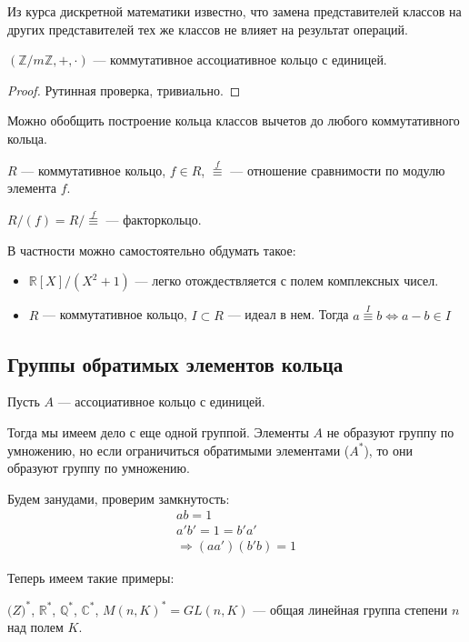 Из курса дискретной математики известно, что замена представителей классов на других представителей тех же классов не влияет на результат операций.

\begin{theorem-non}
  $(\mathbb{Z}/m \mathbb{Z}, +, \cdot)$ --- коммутативное ассоциативное кольцо с единицей.

  \begin{proof}
    Рутинная проверка, тривиально.
  \end{proof}
\end{theorem-non}

\notice
Можно обобщить построение кольца классов вычетов до любого коммутативного кольца. 

$R$ --- коммутативное кольцо, $f\in R$, $\stackrel{f}{\equiv}$ --- отношение сравнимости по модулю элемента $f$.

$R/(f) = R/\stackrel{f}{\equiv}$ --- факторкольцо. 

В частности можно самостоятельно обдумать такое: 

\begin{itemize}
  \item $\mathbb{R}[X]/(X^2 + 1)$ --- легко отождествляется с полем комплексных чисел. 
  \item $R$ --- коммутативное кольцо, $I\subset R$ --- идеал в нем. Тогда $a \stackrel{I}{\equiv} b \Leftrightarrow a - b \in I$
\end{itemize} 

\subsection{Группы обратимых элементов кольца}


Пусть $A$ --- ассоциативное кольцо с единицей. 

Тогда мы имеем дело с еще одной группой. Элементы $A$ не образуют группу по умножению, но если ограничиться обратимыми элементами ($A^*$), то они образуют группу по умножению. 

Будем занудами, проверим замкнутость: 
\begin{gather*}
  ab = 1 \\
  a'b' = 1 = b'a' \\
  \Rightarrow (aa')(b'b) = 1  
\end{gather*}

Теперь имеем такие примеры: 

$\mathbb(Z)^*$, $\mathbb{R}^*$, $\mathbb{Q}^*$, $\mathbb{C}^*$, $M(n, K)^* = GL(n, K)$ --- общая линейная группа степени $n$ над полем $K$.

